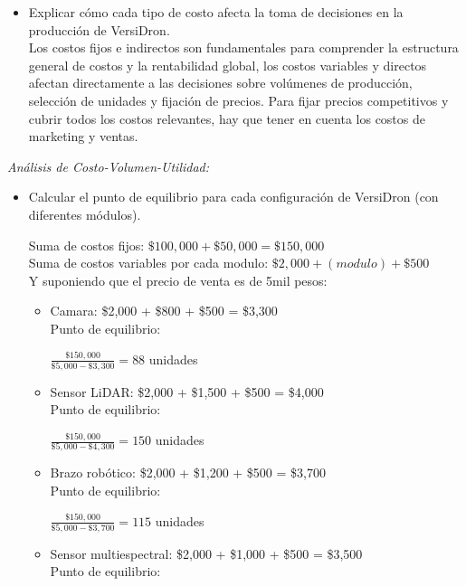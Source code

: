 \documentclass[letterpaper,12pt]{article}
\begin{document}
\begin{sloppypar}
\begin{itemize}
\begin{itemize}
    \end{itemize}
    \newpage
    \item Explicar cómo cada tipo de costo afecta la toma de decisiones en la producción de VersiDron.\\ Los costos fijos e indirectos son fundamentales para comprender la estructura general de costos y la rentabilidad global, los costos variables y directos afectan directamente a las decisiones sobre volúmenes de producción, selección de unidades y fijación de precios. Para fijar precios competitivos y cubrir todos los costos relevantes, hay que tener en cuenta los costos de marketing y ventas.
\end{itemize}
\textit{Análisis de Costo-Volumen-Utilidad:}
\begin{itemize}
    \item Calcular el punto de equilibrio para cada configuración de VersiDron (con
    diferentes módulos).
    \begin{center}
    Suma de costos fijos:
    $\$100,000 + \$50,000 = \$150,000$ \\ 
    Suma de costos variables por cada modulo: $\$2,000 + (modulo) + \$500$ \\ 
    Y suponiendo que el precio de venta es de 5mil pesos:
    \begin{itemize}
        \item Camara: \$2,000 + \$800 + \$500 = \$3,300 \\ Punto de equilibrio:
        
        $\displaystyle \frac{\$150,000}{\$5,000 - \$3,300} = 88$ unidades
        \item Sensor LiDAR:  \$2,000 + \$1,500 + \$500 = \$4,000 \\ Punto de equilibrio:
        
        $\displaystyle \frac{\$150,000}{\$5,000 - \$4,300} = 150$ unidades
        \item Brazo robótico:  \$2,000 + \$1,200 + \$500 = \$3,700 \\ Punto de equilibrio:
        
        $\displaystyle \frac{\$150,000}{\$5,000 - \$3,700} = 115$ unidades
        \item Sensor multiespectral:  \$2,000 + \$1,000 + \$500 = \$3,500 \\ Punto de equilibrio:
        

\end{itemize}
\end{center}
\end{itemize}
\end{sloppypar}
\end{document}
